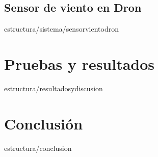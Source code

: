 \documentclass[epsbased,copyright,final,printable,covers,extendedindex,firstnumbered,tfg,gnuplot]{tfgtfmthesisuam}
\begin{document}
	\section{Sensor de viento en Dron\label{SEC:SENSORVIENTODRON}}{estructura/sistema/sensorvientodron}

\chapter{Pruebas y resultados\label{CAP:RESEXPYDISC}}{estructura/resultadosydiscusion}

\chapter{Conclusión\label{CAP:CONCLUSION}}{estructura/conclusion}
%

\end{document}
